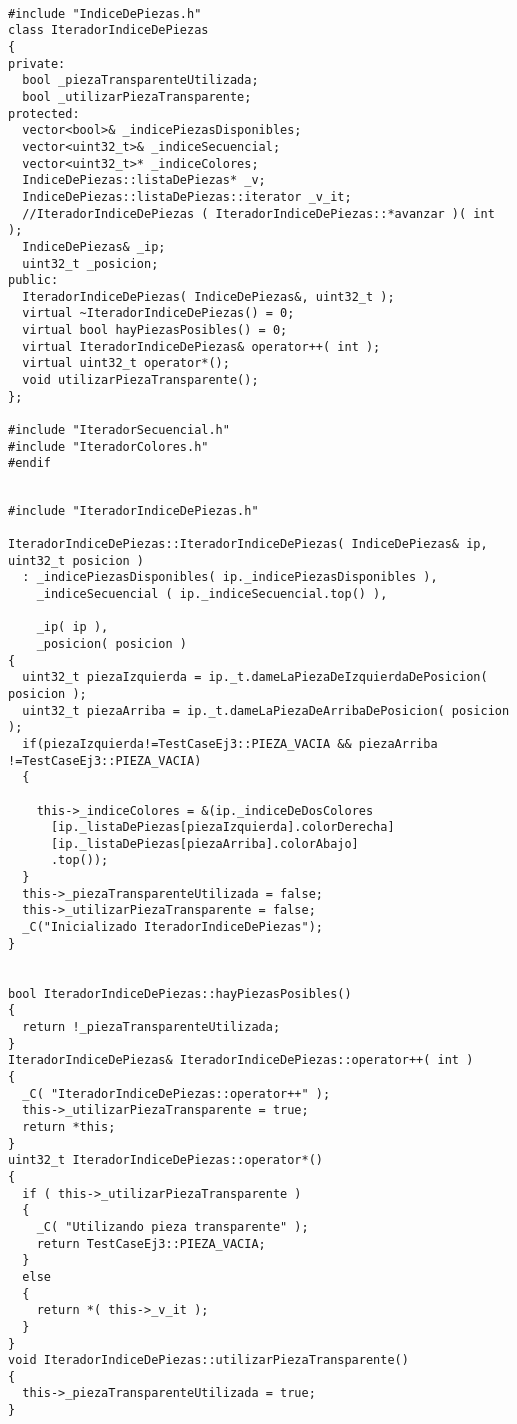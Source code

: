 \documentclass[11pt, a4paper, twoside]{article}
\begin{document}
\begin{lstlisting}

#include "IndiceDePiezas.h"
class IteradorIndiceDePiezas
{
private:
  bool _piezaTransparenteUtilizada;
  bool _utilizarPiezaTransparente;
protected:
  vector<bool>& _indicePiezasDisponibles;
  vector<uint32_t>& _indiceSecuencial;
  vector<uint32_t>* _indiceColores;
  IndiceDePiezas::listaDePiezas* _v;
  IndiceDePiezas::listaDePiezas::iterator _v_it;
  //IteradorIndiceDePiezas ( IteradorIndiceDePiezas::*avanzar )( int );
  IndiceDePiezas& _ip;
  uint32_t _posicion;
public:
  IteradorIndiceDePiezas( IndiceDePiezas&, uint32_t );
  virtual ~IteradorIndiceDePiezas() = 0;
  virtual bool hayPiezasPosibles() = 0;
  virtual IteradorIndiceDePiezas& operator++( int );
  virtual uint32_t operator*();
  void utilizarPiezaTransparente();
};

#include "IteradorSecuencial.h"
#include "IteradorColores.h"
#endif

\end{lstlisting}
\clearpage

\begin{lstlisting}

#include "IteradorIndiceDePiezas.h"

IteradorIndiceDePiezas::IteradorIndiceDePiezas( IndiceDePiezas& ip, uint32_t posicion )
  : _indicePiezasDisponibles( ip._indicePiezasDisponibles ),
    _indiceSecuencial ( ip._indiceSecuencial.top() ),

    _ip( ip ),
    _posicion( posicion )
{
  uint32_t piezaIzquierda = ip._t.dameLaPiezaDeIzquierdaDePosicion( posicion );
  uint32_t piezaArriba = ip._t.dameLaPiezaDeArribaDePosicion( posicion );
  if(piezaIzquierda!=TestCaseEj3::PIEZA_VACIA && piezaArriba !=TestCaseEj3::PIEZA_VACIA)
  {

    this->_indiceColores = &(ip._indiceDeDosColores
      [ip._listaDePiezas[piezaIzquierda].colorDerecha]
      [ip._listaDePiezas[piezaArriba].colorAbajo]
      .top());
  }
  this->_piezaTransparenteUtilizada = false;
  this->_utilizarPiezaTransparente = false;
  _C("Inicializado IteradorIndiceDePiezas");
}


bool IteradorIndiceDePiezas::hayPiezasPosibles()
{
  return !_piezaTransparenteUtilizada;
}
IteradorIndiceDePiezas& IteradorIndiceDePiezas::operator++( int )
{
  _C( "IteradorIndiceDePiezas::operator++" );
  this->_utilizarPiezaTransparente = true;
  return *this;
}
uint32_t IteradorIndiceDePiezas::operator*()
{
  if ( this->_utilizarPiezaTransparente )
  {
    _C( "Utilizando pieza transparente" );
    return TestCaseEj3::PIEZA_VACIA;
  }
  else
  {
    return *( this->_v_it );
  }
}
void IteradorIndiceDePiezas::utilizarPiezaTransparente()
{
  this->_piezaTransparenteUtilizada = true;
}

\end{lstlisting}
\clearpage

\end{document}
